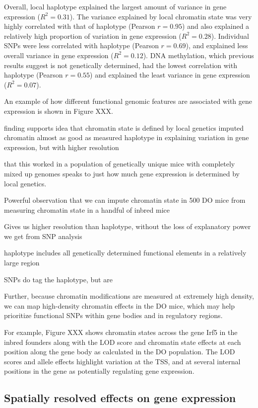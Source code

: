 \documentclass[10pt,letterpaper]{article}
\begin{document}
Overall, local haplotype explained the largest amount of variance in
gene expression (\(R^2 = 0.31\)). The variance explained by local
chromatin state was very highly correlated with that of haplotype
(Pearson \(r = 0.95\)) and also explained a relatively high proportion
of variation in gene expression (\(R^2 = 0.28\)). Individual SNPs were
less correlated with haplotype (Pearson \(r = 0.69\)), and explained
less overall variance in gene expression (\(R^2 = 0.12\)). DNA
methylation, which previous results suggest is not genetically
determined, had the lowest correlation with haplotype (Pearson
\(r = 0.55\)) and explained the least variance in gene expression
(\(R^2 = 0.07\)).

An example of how different functional genomic features are associated
with gene expression is shown in Figure XXX.

finding supports idea that chromatin state is defined by local genetics
imputed chromatin almost as good as measured haplotype in explaining
variation in gene expression, but with higher resolution

that this worked in a population of genetically unique mice with
completely mixed up genomes speaks to just how much gene expression is
determined by local genetics.

Powerful observation that we can impute chromatin state in 500 DO mice
from measuring chromatin state in a handful of inbred mice

Gives us higher resolution than haplotype, without the loss of
explanatory power we get from SNP analysis

haplotype includes all genetically determined functional elements in a
relatively large region

SNPs do tag the haplotype, but are

Further, because chromatin modifications are measured at extremely high
density, we can map high-density chromatin effects in the DO mice, which
may help prioritize functional SNPs within gene bodies and in regulatory
regions.

For example, Figure XXX shows chromatin states across the gene Irf5 in
the inbred founders along with the LOD score and chromatin state effects
at each position along the gene body as calculated in the DO population.
The LOD scores and allele effects highlight variation at the TSS, and at
several internal positions in the gene as potentially regulating gene
expression.

\hypertarget{spatially-resolved-effects-on-gene-expression}{%
\subsection{Spatially resolved effects on gene
expression}\label{spatially-resolved-effects-on-gene-expression}}
\end{document}
